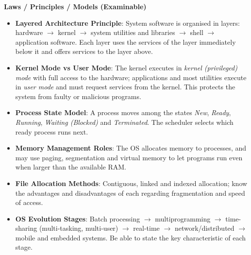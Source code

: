 \documentclass[11pt]{article}
\begin{document}
\begin{bilan}
\textbf{Laws / Principles / Models (Examinable)}
\begin{itemize}
\item \textbf{Layered Architecture Principle}: System software is organised in layers: hardware $\rightarrow$ kernel $\rightarrow$ system utilities and libraries $\rightarrow$ shell $\rightarrow$ application software. Each layer uses the services of the layer immediately below it and offers services to the layer above.
\item \textbf{Kernel Mode vs User Mode}: The kernel executes in \emph{kernel (privileged) mode} with full access to the hardware; applications and most utilities execute in \emph{user mode} and must request services from the kernel. This protects the system from faulty or malicious programs.
\item \textbf{Process State Model}: A process moves among the states \emph{New}, \emph{Ready}, \emph{Running}, \emph{Waiting (Blocked)} and \emph{Terminated}. The scheduler selects which ready process runs next.
\item \textbf{Memory Management Roles}: The OS allocates memory to processes, and may use paging, segmentation and virtual memory to let programs run even when larger than the available RAM.
\item \textbf{File Allocation Methods}: Contiguous, linked and indexed allocation; know the advantages and disadvantages of each regarding fragmentation and speed of access.
\item \textbf{OS Evolution Stages}: Batch processing $\rightarrow$ multiprogramming $\rightarrow$ time-sharing (multi-tasking, multi-user) $\rightarrow$ real-time $\rightarrow$ network/distributed $\rightarrow$ mobile and embedded systems. Be able to state the key characteristic of each stage.
\end{itemize}


\end{bilan}
\end{document}
